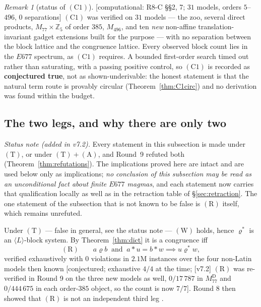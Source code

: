 \documentclass[11pt]{article}
\theoremstyle{plain}
\theoremstyle{definition}
\theoremstyle{remark}
\newtheorem*{remark*}{Remark}
\numberwithin{equation}{section}
\newcommand{\Z}{\mathbb{Z}}
\newcommand{\op}{\mathbin{*}}
\newcommand{\statusbox}[1]{{\small\sloppy\textsf{[#1]}}}
\newcommand{\COMP}[1]{\statusbox{computational: #1}}
\newcommand{\CONJ}[1]{\statusbox{conjectured; #1}}
\begin{document}
\begin{remark*}[status of $(\mathrm{C1})$]
\COMP{R8-C \S\S2, 7; $31$ models, orders $5$--$496$, $0$ separations}
$(\mathrm{C1})$ was verified on $31$ models --- the zoo, several direct products,
$M_{77}\times\Z_5$ of order $385$, $M_{496}$, and ten \emph{new} non-affine
translation-invariant gadget extensions built for the purpose --- with no
separation between the block lattice and the congruence lattice. Every observed
block count lies in the $E677$ spectrum, as $(\mathrm{C1})$ requires. A bounded
first-order search timed out rather than saturating, with a passing positive
control, so $(\mathrm{C1})$ is recorded as \textbf{conjectured true}, not as
shown-underivable: the honest statement is that the natural term route is
provably circular (Theorem~\ref{thm:C1circ}) and no derivation was found within
the budget.
\end{remark*}

\subsection{The two legs, and why there are only two}\label{sec:legs}

\emph{Status note (added in v7.2).} Every statement in this subsection is made
under $(\mathrm{T})$, or under $(\mathrm{T})+(\mathrm{A})$, and Round~9 refuted
both (Theorem~\ref{thm:refutations}). The implications proved here are intact and
are used below only as implications; \emph{no conclusion of this subsection may be
read as an unconditional fact about finite $E677$ magmas}, and each statement
now carries that qualification locally as well as in the retraction table of
\S\ref{sec:retraction}. The one statement of the subsection that is not known to
be false is $(\mathrm{R})$ itself, which remains unrefuted.

Under $(\mathrm{T})$ --- false in general, see the status note ---
$(\mathrm{W})$ holds, hence $\varrho^{*}$ is an
$\langle L\rangle$-block system. By Theorem~\ref{thm:dict} it is a congruence iff
\[
  (\mathrm{R})\qquad a\mathrel\varrho b \ \text{ and } \ a\op u = b\op w
  \implies u\mathrel{\varrho^{*}}w ,
\]
verified exhaustively with $0$ violations in $2.1$M instances over the four
non-Latin models then known \CONJ{exhaustive $4/4$ at the time; [v7.2] $(\mathrm{R})$
was re-verified in Round 9 on the three new models as well, $0/17\,787$ in
$M_{77}^{\mathrm{D}}$ and $0/444\,675$ in each order-$385$ object, so the count
is now $7/7$}. Round 8 then showed that
$(\mathrm{R})$ is not an independent third leg \cite{R8E}.
\end{document}
